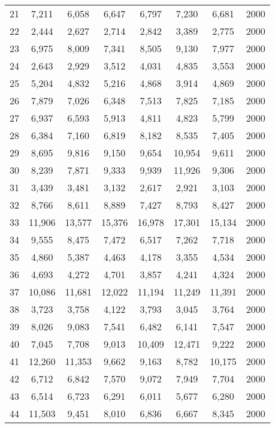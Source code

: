 \begin{longtable}{cccccccc}
21  & 7,211  & 6,058  & 6,647  & 6,797  & 7,230  & 6,681     & 2000 \\
22  & 2,444  & 2,627  & 2,714  & 2,842  & 3,389  & 2,775     & 2000 \\
23  & 6,975  & 8,009  & 7,341  & 8,505  & 9,130  & 7,977     & 2000 \\
24  & 2,643  & 2,929  & 3,512  & 4,031  & 4,835  & 3,553     & 2000 \\
25  & 5,204  & 4,832  & 5,216  & 4,868  & 3,914  & 4,869     & 2000 \\
26  & 7,879  & 7,026  & 6,348  & 7,513  & 7,825  & 7,185     & 2000 \\
27  & 6,937  & 6,593  & 5,913  & 4,811  & 4,823  & 5,799     & 2000 \\
28  & 6,384  & 7,160  & 6,819  & 8,182  & 8,535  & 7,405     & 2000 \\
29  & 8,695  & 9,816  & 9,150  & 9,654  & 10,954 & 9,611     & 2000 \\
30  & 8,239  & 7,871  & 9,333  & 9,939  & 11,926 & 9,306     & 2000 \\
31  & 3,439  & 3,481  & 3,132  & 2,617  & 2,921  & 3,103     & 2000 \\
32  & 8,766  & 8,611  & 8,889  & 7,427  & 8,793  & 8,427     & 2000 \\
33  & 11,906 & 13,577 & 15,376 & 16,978 & 17,301 & 15,134    & 2000 \\
34  & 9,555  & 8,475  & 7,472  & 6,517  & 7,262  & 7,718     & 2000 \\
35  & 4,860  & 5,387  & 4,463  & 4,178  & 3,355  & 4,534     & 2000 \\
36  & 4,693  & 4,272  & 4,701  & 3,857  & 4,241  & 4,324     & 2000 \\
37  & 10,086 & 11,681 & 12,022 & 11,194 & 11,249 & 11,391    & 2000 \\
38  & 3,723  & 3,758  & 4,122  & 3,793  & 3,045  & 3,764     & 2000 \\
39  & 8,026  & 9,083  & 7,541  & 6,482  & 6,141  & 7,547     & 2000 \\
40  & 7,045  & 7,708  & 9,013  & 10,409 & 12,471 & 9,222     & 2000 \\
41  & 12,260 & 11,353 & 9,662  & 9,163  & 8,782  & 10,175    & 2000 \\
42  & 6,712  & 6,842  & 7,570  & 9,072  & 7,949  & 7,704     & 2000 \\
43  & 6,514  & 6,723  & 6,291  & 6,011  & 5,677  & 6,280     & 2000 \\
44  & 11,503 & 9,451  & 8,010  & 6,836  & 6,667  & 8,345     & 2000 \\

\end{longtable}
